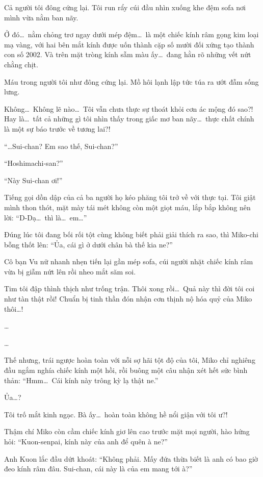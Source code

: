\documentclass[../main.tex]{subfiles}
\begin{document}
Cả người tôi đông cứng lại. Tôi run rẩy cúi đầu nhìn xuống khe đệm sofa nơi mình vừa nằm ban nãy.

Ở đó\dots\ nằm chỏng trơ ngay dưới mép đệm\dots\ là một chiếc kính râm gọng kim loại mạ vàng, với hai bên mắt kính được uốn thành cặp số mười đối xứng tạo thành con số 2002. Và trên mặt tròng kính sẫm màu ấy\dots\ đang hằn rõ những vết nứt chằng chịt.

Máu trong người tôi như đông cứng lại. Mồ hôi lạnh lập tức túa ra ướt đẫm sống lưng.

Không\dots\ Không lẽ nào\dots\ Tôi vẫn chưa thực sự thoát khỏi cơn ác mộng đó sao?! Hay là\dots\ tất cả những gì tôi nhìn thấy trong giấc mơ ban nãy\dots\ thực chất chính là một sự báo trước về tương lai?!

``\dots Sui-chan? Em sao thế, Sui-chan?''

``Hoshimachi-san?''

``Này Sui-chan ơi!''

Tiếng gọi dồn dập của cả ba người họ kéo phăng tôi trở về với thực tại. Tôi giật mình thon thót, mặt mày tái mét không còn một giọt máu, lắp bắp không nên lời: ``D-Dạ\dots\ thì là\dots\ em\dots''

Đúng lúc tôi đang bối rối tột cùng không biết phải giải thích ra sao, thì Miko-chi bỗng thốt lên: ``Ủa, cái gì ở dưới chân bà thế kia ne?''

Cô bạn Vu nữ nhanh nhẹn tiến lại gần mép sofa, cúi người nhặt chiếc kính râm vừa bị giẫm nứt lên rồi nheo mắt săm soi.

Tim tôi đập thình thịch như trống trận. Thôi xong rồi\dots\ Quả này thì đời tôi coi như tàn thật rồi! Chuẩn bị tinh thần đón nhận cơn thịnh nộ hóa quỷ của Miko thôi\dots!

\dots

\dots

Thế nhưng, trái ngược hoàn toàn với nỗi sợ hãi tột độ của tôi, Miko chỉ nghiêng đầu ngắm nghía chiếc kính một hồi, rồi buông một câu nhận xét hết sức bình thản: ``Hmm\dots\ Cái kính này trông kỳ lạ thật ne.''

Ủa\dots?

Tôi trố mắt kinh ngạc. Bà ấy\dots\ hoàn toàn không hề nổi giận với tôi ư?!

Thậm chí Miko còn cầm chiếc kính giơ lên cao trước mặt mọi người, hào hứng hỏi: ``Kuon-senpai, kính này của anh để quên à ne?''

Anh Kuon lắc đầu dứt khoát: ``Không phải. Mấy đứa thừa biết là anh có bao giờ đeo kính râm đâu. Sui-chan, cái này là của em mang tới à?''
\end{document}
